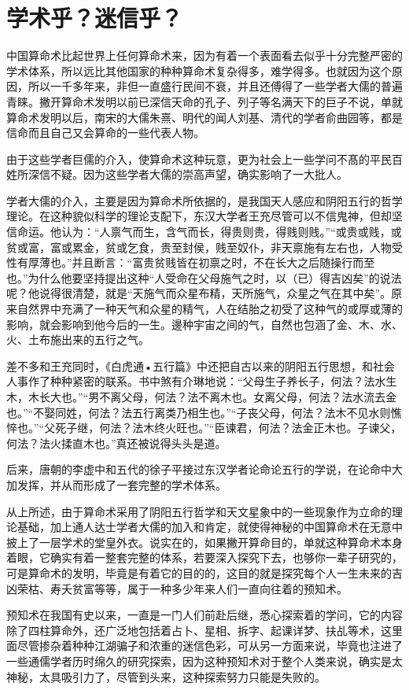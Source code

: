 \documentclass[a5paper,oneside,12pt]{ctexbook}
\begin{document}
{{\section{学术乎？迷信乎？}
中国算命术比起世界上任何算命术来，因为有着一个表面看去似乎十分完整严密的学术体系，所以远比其他国家的种种算命术复杂得多，难学得多。也就因为这个原因，所以一千多年来，非但一直盛行民间不衰，并且还傅得了一些学者大儒的普遍青睐。撇开算命术发明以前已深信天命的孔子、列子等名满天下的巨子不说，单就算命术发明以后，南宋的大儒朱熹、明代的闻人刘基、清代的学者俞曲园等，都是信命而且自己又会算命的一些代表人物。

由于这些学者巨儒的介入，使算命术这种玩意，更为社会上一些学问不髙的平民百姓所深信不疑。因为这些学者大儒的崇高声望，确实影响了一大批人。

学者大儒的介入，主要是因为算命术所依据的，是我国天人感应和阴阳五行的哲学理论。在这种貌似科学的理论支配下，东汉大学者王充尽管可以不信鬼神，但却坚信命运。他认为：“人禀气而生，含气而长，得贵则贵，得贱则贱。”“或贵或贱，或贫或富，富或累金，贫或乞食，贵至封侯，贱至奴仆，非天禀施有左右也，人物受性有厚薄也。”并且断言：“富贵贫贱皆在初禀之时，不在长大之后随操行而至也。”为什么他要坚持提出这种“人受命在父母施气之时，以（已）得吉凶矣”的说法呢？他说得很清楚，就是“天施气而众星布精，天所施气，众星之气在其中矣”。原来自然界中充满了一种天气和众星的精气，人在结胎之初受了这种气的或厚或薄的影响，就会影响到他今后的一生。邊种宇宙之间的气，自然也包涵了金、木、水、火、土布施出来的五行之气。

差不多和王充同时，《白虎通•五行篇》中还把自古以来的阴阳五行思想，和社会人事作了种种紧密的联系。书中煞有介琳地说：“父母生子养长子，何法？法水生木，木长大也。”“男不离父母，何法？法不离木也。女离父母，何法？法水流去金也。”“不娶同姓，何法？法五行离类乃相生也。”“子丧父母，何法？法木不见水则憔悴也。”“父死子继，何法？法木终火旺也。”“臣谏君，何法？法金正木也。子谏父，何法？法火揉直木也。”真还被说得头头是道。

后来，唐朝的李虚中和五代的徐子平接过东汉学者论命论五行的学说，在论命中大加发挥，并从而形成了一套完整的学术体系。

从上所述，由于算命术采用了阴阳五行哲学和天文星象中的一些现象作为立命的理论基础，加上通人达士学者大儒的加入和肯定，就使得神秘的中国算命术在无意中披上了一层学术的堂皇外衣。说实在的，如果撇开算命目的，单就这种算命术本身着眼，它确实有着一整套完整的体系，若要深入探究下去，也够你一辈子研究的，可是算命术的发明，毕竟是有着它的目的的，这目的就是探究每个人一生未来的吉凶荣枯、寿夭贫富等等，属于一种多少年来人们一直向往着的预知术。

预知术在我国有史以来，一直是一门人们前赴后继，悉心探索着的学问，它的内容除了四柱算命外，还广泛地包括着占卜、星相、拆字、起课详梦、扶乩等术，这里面尽管掺杂着种种江湖骗子和浓重的迷信色彩，可从另一方面来说，毕竟也注进了一些通儒学者历时绵久的研究探索，因为这种预知术对于整个人类来说，确实是太神秘，太具吸引力了，尽管到头来，这种探索努力只能是失败的。

}}
\end{document}
